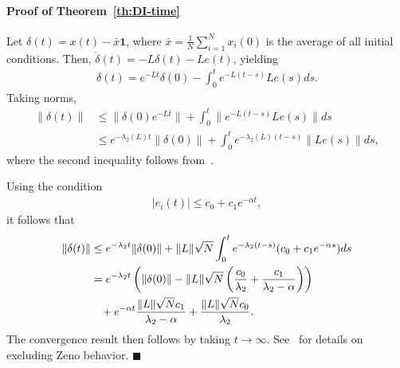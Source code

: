 \documentclass{autart}
\newcommand{\TwoNorm}[1]{\|#1\|}
\begin{document}
{\paragraph*{\textbf{Proof of Theorem~\ref{th:DI-time}}}
Let $\delta(t) = x(t) - \bar{x} \mathbf{1}$, where $\bar{x} = \frac{1}{N}
\sum_{i=1}^N x_i(0)$ is the average of all initial conditions. Then,
$\dot{\delta}(t) = - L \delta(t) - L e(t)$, yielding
\begin{align*}
  \delta(t) = e^{-Lt} \delta(0) - \int_0^t e^{-L(t-s)} L e(s) ds .
\end{align*}
Taking norms,
\begin{align*}
  \TwoNorm{\delta(t)} &\leq \TwoNorm{ \delta(0) e^{-Lt}} + \int_0^t
  \TwoNorm{ e^{-L(t-s)} Le(s) } ds
  \\
  &\leq e^{- \lambda_2(L) t} \TwoNorm{\delta(0)} + \int_0^t
  e^{-\lambda_2(L)(t-s)} \TwoNorm{L e(s)} ds, 
\end{align*}
where the second inequality follows from~\cite[Lemma 2.1]{GSS-DVD-KHJ:13}.

Using the condition
\begin{align*}
  | e_i(t) | \leq c_0 + c_1 e^{-\alpha t},
\end{align*}
it follows that
\begin{align*}
  \TwoNorm{\delta(t)} &\leq e^{-\lambda_2 t} \TwoNorm{\delta(0)} +
  \TwoNorm{L} \sqrt{N} \int_0^t e^{-\lambda_2(t-s)} (c_0 + c_1
  e^{-\alpha s}) ds
  \\
  &= e^{-\lambda_2 t} \left( \TwoNorm{\delta(0)} - \TwoNorm{L}
    \sqrt{N} \left( \frac{c_0}{\lambda_2} + \frac{c_1}{\lambda_2 -
        \alpha} \right) \right) \\
        & \hspace*{2ex} + e^{-\alpha t} \frac{ \TwoNorm{L}
    \sqrt{N} c_1}{\lambda_2 - \alpha} + \frac{ \TwoNorm{L} \sqrt{N}
    c_0 }{\lambda_2}.
\end{align*}
The convergence result then follows by taking $t \rightarrow \infty$. 
See~\citep{GSS-DVD-KHJ:13} for details on excluding Zeno behavior.
\hfill $\blacksquare$

}
\end{document}
